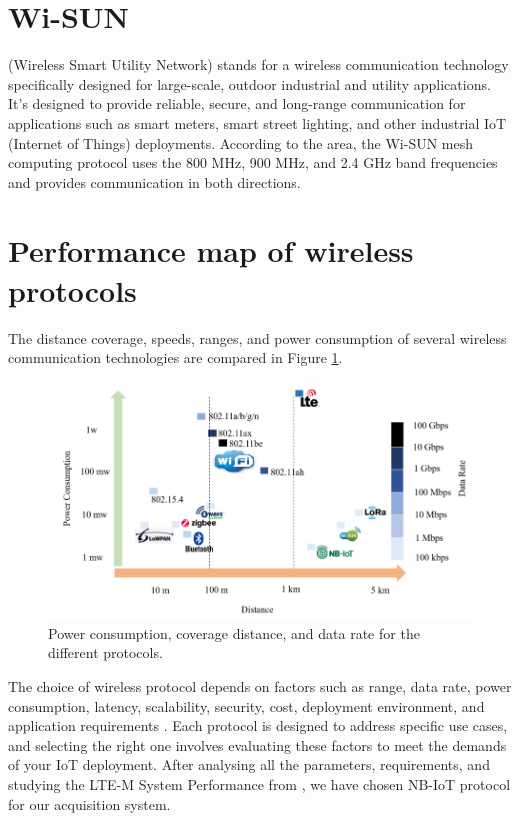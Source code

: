 \section{Wi-SUN}
(Wireless Smart Utility Network) stands for a wireless communication technology specifically designed for large-scale, outdoor industrial and utility applications. It's designed to provide reliable, secure, and long-range communication for applications such as smart meters, smart street lighting, and other industrial IoT (Internet of Things) deployments. According to the area, the Wi-SUN mesh computing protocol uses the 800 MHz, 900 MHz, and 2.4 GHz band frequencies and provides communication in both directions.

\section{Performance map of wireless protocols}
The distance coverage, speeds, ranges, and power consumption of several wireless communication technologies are compared in Figure \ref{fig:x Performance MAP}.

\begin{figure}[htbp]
\centering
\includegraphics[scale=0.9]{images/PerformanceMap.png}
\caption{Power consumption, coverage distance, and data rate for the different protocols.}
\label{fig:x Performance MAP}
\end{figure}
The choice of wireless protocol depends on factors such as range, data rate, power consumption, latency, scalability, security, cost, deployment environment, and application requirements \cite{PerformanceMAP}. Each protocol is designed to address specific use cases, and selecting the right one involves evaluating these factors to meet the demands of your IoT deployment. After analysing all the parameters, requirements, and studying the LTE-M System Performance from \cite{LTE-M_Perform}, we have chosen NB-IoT protocol for our acquisition system.




